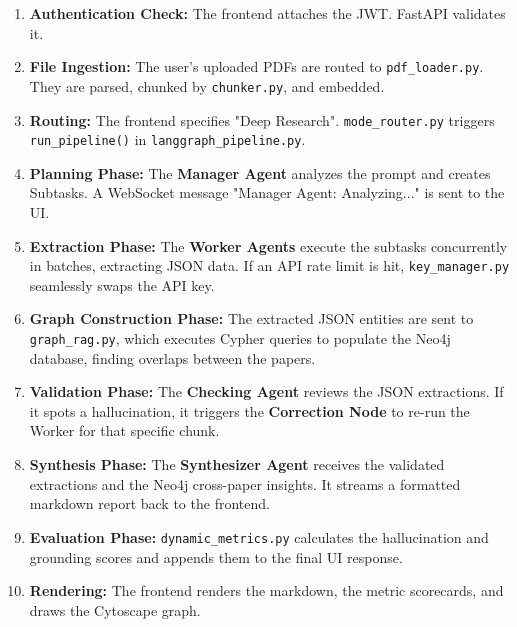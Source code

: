 \documentclass[12pt, a4paper]{report}
\begin{document}
\begin{enumerate}
    \item \textbf{Authentication Check:} The frontend attaches the JWT. FastAPI validates it.
    \item \textbf{File Ingestion:} The user's uploaded PDFs are routed to \texttt{pdf\_loader.py}. They are parsed, chunked by \texttt{chunker.py}, and embedded.
    \item \textbf{Routing:} The frontend specifies "Deep Research". \texttt{mode\_router.py} triggers \texttt{run\_pipeline()} in \texttt{langgraph\_pipeline.py}.
    \item \textbf{Planning Phase:} The \textbf{Manager Agent} analyzes the prompt and creates Subtasks. A WebSocket message "Manager Agent: Analyzing..." is sent to the UI.
    \item \textbf{Extraction Phase:} The \textbf{Worker Agents} execute the subtasks concurrently in batches, extracting JSON data. If an API rate limit is hit, \texttt{key\_manager.py} seamlessly swaps the API key.
    \item \textbf{Graph Construction Phase:} The extracted JSON entities are sent to \texttt{graph\_rag.py}, which executes Cypher queries to populate the Neo4j database, finding overlaps between the papers.
    \item \textbf{Validation Phase:} The \textbf{Checking Agent} reviews the JSON extractions. If it spots a hallucination, it triggers the \textbf{Correction Node} to re-run the Worker for that specific chunk.
    \item \textbf{Synthesis Phase:} The \textbf{Synthesizer Agent} receives the validated extractions and the Neo4j cross-paper insights. It streams a formatted markdown report back to the frontend.
    \item \textbf{Evaluation Phase:} \texttt{dynamic\_metrics.py} calculates the hallucination and grounding scores and appends them to the final UI response.
    \item \textbf{Rendering:} The frontend renders the markdown, the metric scorecards, and draws the Cytoscape graph.
\end{enumerate}
\end{document}
